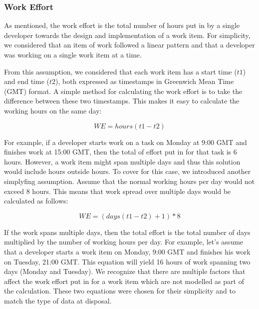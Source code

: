 \documentclass{mpaper}
\begin{document}
\subsubsection*{Work Effort}
\label{work-effort}

As mentioned, the work effort is the total number of hours put in by a single
developer towards the design and implementation of a work item. For simplicity,
we considered that an item of work followed a linear pattern and that a
developer was working on a single work item at a time.

From this assumption, we considered that each work item has a start time ($t1$)
and end time ($t2$), both expressed as timestamps in Greenwich Mean Time (GMT)
format. A simple method for calculating the work effort is to take the
difference between these two timestamps. This makes it easy to calculate the
working hours on the same day:

\begin{equation}
  \label{eq-work-effort-simple}
  WE = hours(t1 - t2)
\end{equation}

For example, if a developer starts work on a task on Monday at 9:00 GMT and
finishes work at 15:00 GMT, then the total of effort put in for that task is 6
hours. However, a work item might span multiple days and thus this solution
would include hours outside hours. To cover for this case, we introduced another
simplyfing assumption. Assume that the normal working hours per day would not
exceed 8 hours. This means that work spread over multiple days would be
calculated as follows:

\begin{equation}
  \label{eq-work-effort-days}
  WE = (days(t1 - t2) + 1) * 8
\end{equation}

If the work spans multiple days, then the total effort is the total number of
days multiplied by the number of working hours per day. For example, let's
assume that a developer starts a work item on Monday, 9:00 GMT and finishes his
work on Tuesday, 21:00 GMT. This equation will yield 16 hours of work spanning
two days (Monday and Tuesday). We recognize that there are multiple factors that
affect the work effort put in for a work item which are not modelled as part of
the calculation. These two equations were chosen for their simplicity and to
match the type of data at disposal. 
\end{document}
